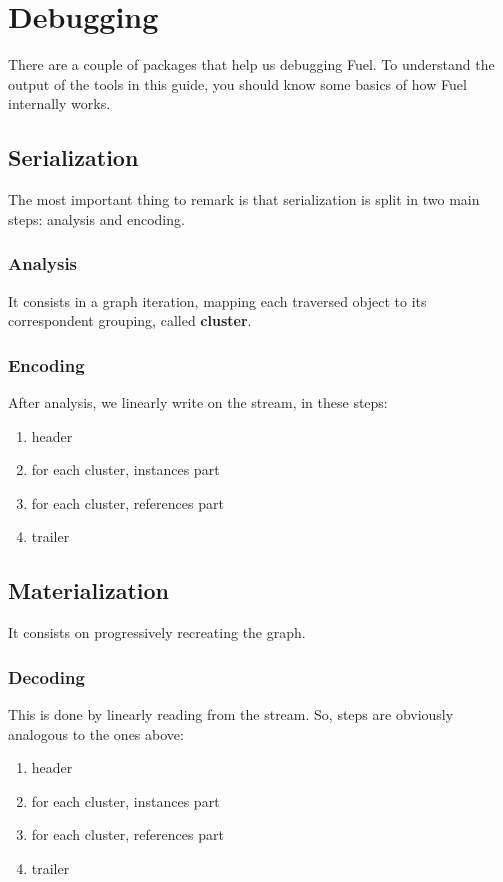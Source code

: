 \documentclass[a4paper,10pt,twoside]{book}
\begin{document}
\section{Debugging}

There are a couple of packages that help us debugging Fuel. To understand the output of the tools in this guide, you should know some basics of how Fuel internally works. 

\subsection{Serialization}
The most important thing to remark is that serialization is split in two main steps: analysis and encoding.

\subsubsection{Analysis}
It consists in a graph iteration, mapping each traversed object to its correspondent grouping, called \textbf{cluster}. 

\subsubsection{Encoding}
After analysis, we linearly write on the stream, in these steps:

\begin{enumerate}
\item header
\item for each cluster, instances part
\item for each cluster, references part
\item trailer
\end{enumerate}

\subsection{Materialization}
It consists on progressively recreating the graph.

\subsubsection{Decoding}
This is done by linearly reading from the stream. So, steps are obviously analogous to the ones above:

\begin{enumerate}
\item header
\item for each cluster, instances part
\item for each cluster, references part
\item trailer
\end{enumerate}
\end{document}
